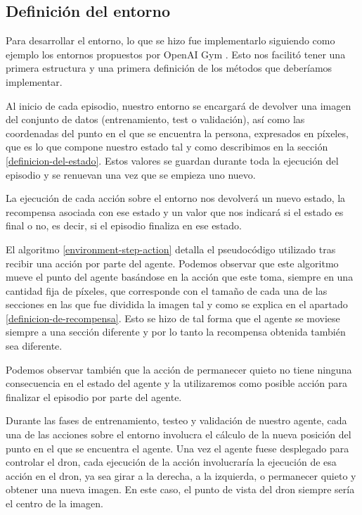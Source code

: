 \subsection{Definición del entorno}
\label{definicion-del-entorno}

Para desarrollar el entorno, lo que se hizo fue implementarlo siguiendo como ejemplo los entornos propuestos por OpenAI Gym \citep{openaigym}. Esto nos facilitó tener una primera estructura y una primera definición de los métodos que deberíamos implementar.
\medskip

Al inicio de cada episodio, nuestro entorno se encargará de devolver una imagen del conjunto de datos (entrenamiento, test o validación), así como las coordenadas del punto en el que se encuentra la persona, expresados en píxeles, que es lo que compone nuestro estado tal y como describimos en la sección \ref{definicion-del-estado}. Estos valores se guardan durante toda la ejecución del episodio y se renuevan una vez que se empieza uno nuevo.
\medskip


La ejecución de cada acción sobre el entorno nos devolverá un nuevo estado, la recompensa asociada con ese estado y un valor que nos indicará si el estado es final o no, es decir, si el episodio finaliza en ese estado. 
\medskip

El algoritmo \ref{environment-step-action} detalla el pseudocódigo utilizado tras recibir una acción por parte del agente. Podemos observar que este algoritmo mueve el punto del agente basándose en la acción que este toma, siempre en una cantidad fija de píxeles, que corresponde con el tamaño de cada una de las secciones en las que fue dividida la imagen tal y como se explica en el apartado \ref{definicion-de-recompensa}. Esto se hizo de tal forma que el agente se moviese siempre a una sección diferente y por lo tanto la recompensa obtenida también sea diferente.
\medskip



Podemos observar también que la acción de permanecer quieto no tiene ninguna consecuencia en el estado del agente y la utilizaremos como posible acción para finalizar el episodio por parte del agente.
\medskip

Durante las fases de entrenamiento, testeo y validación de nuestro agente, cada una de las acciones sobre el entorno involucra el cálculo de la nueva posición del punto en el que se encuentra el agente. Una vez el agente fuese desplegado para controlar el dron, cada ejecución de la acción involucraría la ejecución de esa acción en el dron, ya sea girar a la derecha, a la izquierda, o permanecer quieto y obtener una nueva imagen. En este caso, el punto de vista del dron siempre sería el centro de la imagen.
\medskip

